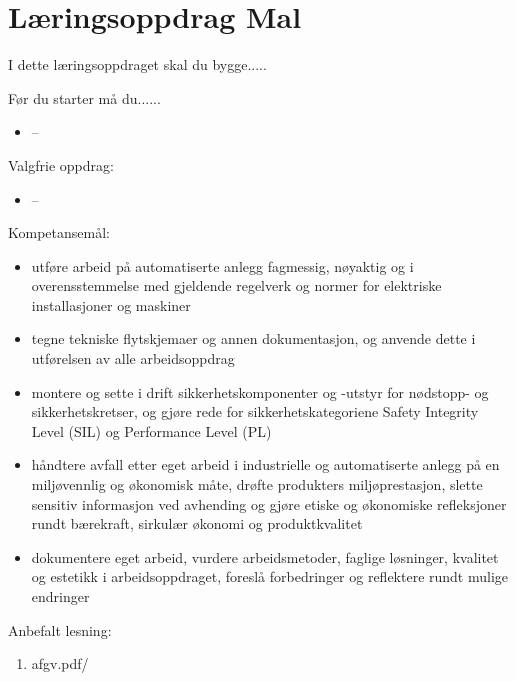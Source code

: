 
\noindent
\section*{Læringsoppdrag Mal}

\vskip 5pt
I dette læringsoppdraget skal du bygge.....

Før du  starter må du......
\begin{itemize}[noitemsep]
	\item --
\end{itemize}

\vskip 5pt 
Valgfrie oppdrag:

\vskip 5pt 
\begin{itemize}[noitemsep]
	\item --
\end{itemize}



\vskip 2.5pt 
Kompetansemål:
\begin{itemize}[noitemsep]

	\item utføre arbeid på automatiserte anlegg fagmessig, nøyaktig og i overensstemmelse med gjeldende regelverk og normer for elektriske installasjoner og maskiner
	\item tegne tekniske flytskjemaer og annen dokumentasjon, og anvende dette i utførelsen av alle arbeidsoppdrag
	\item montere og sette i drift sikkerhetskomponenter og -utstyr for nødstopp- og sikkerhetskretser, og gjøre rede for sikkerhetskategoriene Safety Integrity Level (SIL) og Performance Level (PL)
	\item håndtere avfall etter eget arbeid i industrielle og automatiserte anlegg på en miljøvennlig og økonomisk måte, drøfte produkters miljøprestasjon, slette sensitiv informasjon ved avhending og gjøre etiske og økonomiske refleksjoner rundt bærekraft, sirkulær økonomi og produktkvalitet
	\item dokumentere eget arbeid, vurdere arbeidsmetoder, faglige løsninger, kvalitet og estetikk i arbeidsoppdraget, foreslå forbedringer og reflektere rundt mulige endringer




\end{itemize}

Anbefalt lesning:

\begin{enumerate}
	\item afgv.pdf/ 
\end{enumerate}

